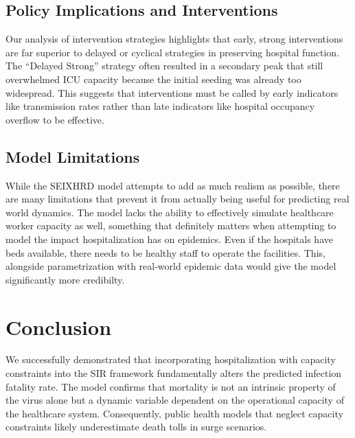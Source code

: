 \documentclass[10pt,twocolumn]{article}
\begin{document}
\subsection{Policy Implications and Interventions}

Our analysis of intervention strategies highlights that early, strong interventions are far superior to delayed or cyclical strategies in preserving hospital function.
The “Delayed Strong” strategy often resulted in a secondary peak that still overwhelmed ICU capacity because the initial seeding was already too widespread. 
This suggests that interventions must be called by early indicators like transmission rates rather than late indicators like hospital occupancy overflow to be effective.

\subsection{Model Limitations}

While the SEIXHRD model attempts to add as much realism as possible, there are many limitations that prevent it from actually being useful for predicting real world dynamics.
The model lacks the ability to effectively simulate healthcare worker capacity as well, something that definitely matters when attempting to model the impact hospitalization has on epidemics.
Even if the hospitals have beds available, there needs to be healthy staff to operate the facilities. 
This, alongside parametrization with real-world epidemic data would give the model significantly more credibilty.

\section{Conclusion}

We successfully demonstrated that incorporating hospitalization with capacity constraints into the SIR framework fundamentally alters the predicted infection fatality rate.
The model confirms that mortality is not an intrinsic property of the virus alone but a dynamic variable dependent on the operational capacity of the healthcare system. Consequently, public health models that neglect capacity constraints likely underestimate death tolls in surge scenarios.

\end{document}
